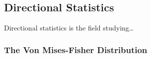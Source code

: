 \subsection{Directional Statistics}

Directional statistics is the field studying\dots

\subsubsection{The Von Mises-Fisher Distribution}